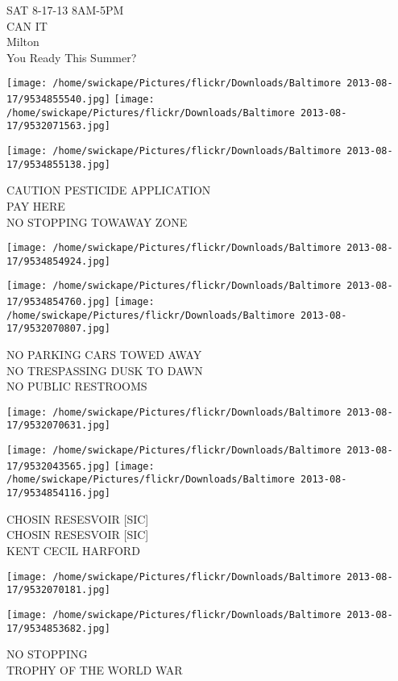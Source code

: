 \documentclass[10pt,letterpaper]{article}
\begin{document}
SAT 8{-}17{-}13 8AM{-}5PM\\
CAN IT\\
Milton\\
You Ready This Summer?
\pagebreak

\texttt{[image: /home/swickape/Pictures/flickr/Downloads/Baltimore 2013-08-17/9534855540.jpg]}
\texttt{[image: /home/swickape/Pictures/flickr/Downloads/Baltimore 2013-08-17/9532071563.jpg]}

\texttt{[image: /home/swickape/Pictures/flickr/Downloads/Baltimore 2013-08-17/9534855138.jpg]}

CAUTION PESTICIDE APPLICATION\\
PAY HERE\\
NO STOPPING TOWAWAY ZONE
\pagebreak

\texttt{[image: /home/swickape/Pictures/flickr/Downloads/Baltimore 2013-08-17/9534854924.jpg]}

\vspace{0.25in}
\texttt{[image: /home/swickape/Pictures/flickr/Downloads/Baltimore 2013-08-17/9534854760.jpg]}
\texttt{[image: /home/swickape/Pictures/flickr/Downloads/Baltimore 2013-08-17/9532070807.jpg]}

NO PARKING CARS TOWED AWAY\\
NO TRESPASSING DUSK TO DAWN\\
NO PUBLIC RESTROOMS
\pagebreak

\texttt{[image: /home/swickape/Pictures/flickr/Downloads/Baltimore 2013-08-17/9532070631.jpg]}

\vspace{0.25in}
\texttt{[image: /home/swickape/Pictures/flickr/Downloads/Baltimore 2013-08-17/9532043565.jpg]}
\texttt{[image: /home/swickape/Pictures/flickr/Downloads/Baltimore 2013-08-17/9534854116.jpg]}

CHOSIN RESESVOIR {[}SIC{]}\\
CHOSIN RESESVOIR {[}SIC{]}\\
KENT CECIL HARFORD
\pagebreak

\texttt{[image: /home/swickape/Pictures/flickr/Downloads/Baltimore 2013-08-17/9532070181.jpg]}

\vspace{0.25in}
\texttt{[image: /home/swickape/Pictures/flickr/Downloads/Baltimore 2013-08-17/9534853682.jpg]}

NO STOPPING\\
TROPHY OF THE WORLD WAR
\pagebreak
\end{document}
